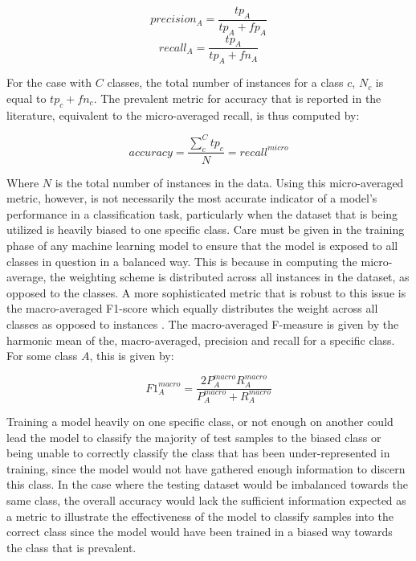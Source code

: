 \documentclass[../../fyp.tex]{subfiles}
\begin{document}
\begin{equation} \label{eq:precision}
	precision_A = \frac{tp_A}{tp_A + fp_A}
\end{equation}
\begin{equation} \label{eq:recall}
	recall_A = \frac{tp_A}{tp_A + fn_A}
\end{equation}

For the case with $C$ classes, the total number of instances for a class $c$, $N_c$ is equal to $tp_c + fn_c$. The prevalent metric for accuracy that is reported in the literature, equivalent to the micro-averaged recall, is thus computed by:

\begin{equation} \label{eq:accuracy}
	accuracy = \frac{\sum_{c}^{C}tp_c}{N} = recall^{micro}
\end{equation}

Where $N$ is the total number of instances in the data. Using this micro-averaged metric, however, is not necessarily the most accurate indicator of a model's performance in a classification task, particularly when the dataset that is being utilized is heavily biased to one specific class. Care must be given in the training phase of any machine learning model to ensure that the model is exposed to all classes in question in a balanced way. This is because in computing the micro-average, the weighting scheme is distributed across all instances in the dataset, as opposed to the classes. A more sophisticated metric that is robust to this issue is the macro-averaged F1-score which equally distributes the weight across all classes as opposed to instances \citep{manning2010}. The macro-averaged F-measure is given by the harmonic mean of the, macro-averaged, precision and recall for a specific class. For some class $A$, this is given by:

\begin{equation} \label{eq:f1_measure}
	F1^{macro}_{A} = \frac{2P^{macro}_{A}R^{macro}_{A}}{P^{macro}_{A}+R^{macro}_{A}}
\end{equation}

Training a model heavily on one specific class, or not enough on another could lead the model to classify the majority of test samples to the biased class or being unable to correctly classify the class that has been under-represented in training, since the model would not have gathered enough information to discern this class. In the case where the testing dataset would be imbalanced towards the same class, the overall accuracy would lack the sufficient information expected as a metric to illustrate the effectiveness of the model to classify samples into the correct class since the model would have been trained in a biased way towards the class that is prevalent.
\end{document}
